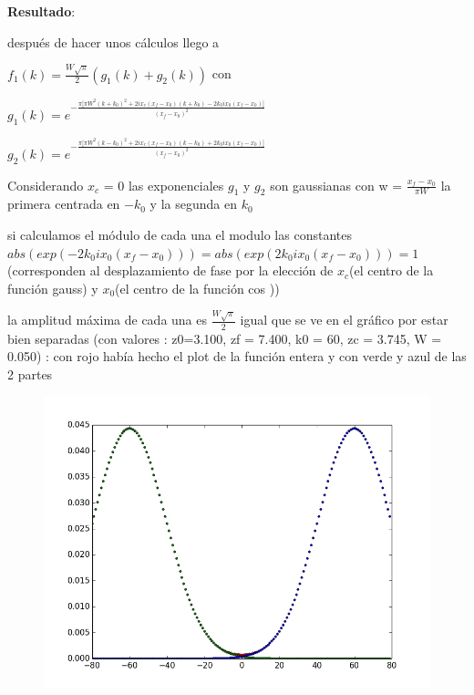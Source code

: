 \documentclass{article}
\begin{document}
\textbf{Resultado}:
\begin{description}
\item después de hacer unos cálculos llego a 
\item $f_1(k) = \frac{W \sqrt{\pi}}{2} (g_1(k) + g_2(k)) $ con
\item $g_1(k) =  e^{-\frac{\pi \big[ \pi  W^2 (k + k_0)^2   + 2  i x_c(x_f - x_0)(k+ k_0)   - 2 k_0 i x_0 (x_f-x_0) \big]}{(x_f-x_0)^2}}$
\item $g_2(k) = e^{-\frac{\pi \big[\pi  W^2 (k - k_0)^2  +2 i x_c(x_f - x_0)(k - k_0)  + 2 k_0 i x_0 (x_f-x_0)\big]}{(x_f - x_0)^2}} $

\item Considerando $x_c$ = 0 las exponenciales $g_1$ y $g_2$ son  gaussianas  con w = $\frac{x_f - x_0}{\pi W}$ la primera centrada en $-k_0$ y la segunda en $k_0$
\item si calculamos el módulo de cada una  el modulo las constantes $ abs(exp( - 2 k_0 i x_0 (x_f-x_0))) = abs(exp( 2 k_0 i x_0 (x_f-x_0)))  = 1$
(corresponden al desplazamiento de fase por la elección de $x_c$(el centro de la función gauss) y $x_0$(el centro de la función cos ))
\item la amplitud  máxima de cada una es $\frac{W \sqrt{\pi}}{2}$ igual que se ve en el gráfico por estar bien separadas (con valores :  z0=3.100, zf = 7.400, k0 = 60, zc = 3.745, W = 0.050) : con rojo había hecho el plot de la función entera y con verde y azul de las 2 partes 

\item \begin{figure}[!ht] 
 \centering 
 \includegraphics[scale=0.5]{gauss.png} 
\end{figure} 

\end{description}
\end{document}
